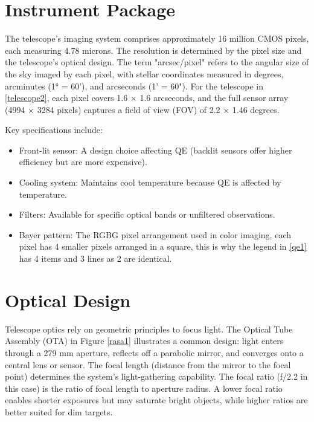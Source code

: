 \documentclass[12pt,oneside,a4paper,english]{article}
\begin{document}
\section{Instrument Package}
The telescope's imaging system comprises approximately 16 million CMOS pixels, each measuring 4.78 microns. The resolution is determined by the pixel size and the telescope's optical design. The term "arcsec/pixel" refers to the angular size of the sky imaged by each pixel, with stellar coordinates measured in degrees, arcminutes (1° = 60'), and arcseconds (1' = 60"). For the telescope in \ref{telescope2}, each pixel covers 1.6 × 1.6 arcseconds, and the full sensor array (4994 × 3284 pixels) captures a field of view (FOV) of 2.2 × 1.46 degrees.

Key specifications include:
\begin{itemize}
    \item Front-lit sensor: A design choice affecting QE (backlit sensors offer higher efficiency but are more expensive). 
    \item Cooling system: Maintains cool temperature because QE is affected by temperature.
    \item Filters: Available for specific optical bands or unfiltered observations.
    \item Bayer pattern: The RGBG pixel arrangement used in color imaging, each pixel has 4 smaller pixels arranged in a square, this is why the legend in \ref{qe1} has 4 items and 3 lines as 2 are identical.
\end{itemize}

\section{Optical Design}
Telescope optics rely on geometric principles to focus light. The Optical Tube Assembly (OTA) in Figure \ref{rasa1} illustrates a common design: light enters through a 279 mm aperture, reflects off a parabolic mirror, and converges onto a central lens or sensor. The focal length (distance from the mirror to the focal point) determines the system's light-gathering capability. The focal ratio (f/2.2 in this case) is the ratio of focal length to aperture radius. A lower focal ratio enables shorter exposures but may saturate bright objects, while higher ratios are better suited for dim targets.
\end{document}
